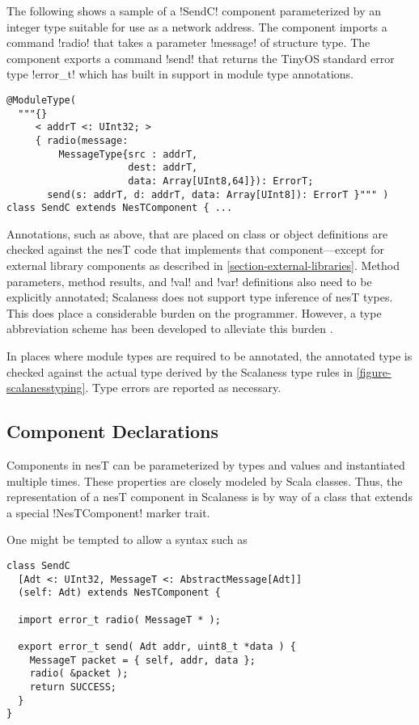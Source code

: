 The following shows a sample of a !SendC! component parameterized by an integer type suitable
for use as a network address. The component imports a command !radio! that takes a parameter
!message! of structure type. The component exports a command !send! that returns the TinyOS
standard error type !error_t! which has built in support in module type annotations.

\singlespace
\vspace{1.0ex}
\begin{lstlisting}[language=scalaness]
@ModuleType(
  """{}
     < addrT <: UInt32; >
     { radio(message:
         MessageType{src : addrT,
                     dest: addrT,
                     data: Array[UInt8,64]}): ErrorT;
       send(s: addrT, d: addrT, data: Array[UInt8]): ErrorT }""" )
class SendC extends NesTComponent { ...
\end{lstlisting}
\vspace{1.0ex}
\primaryspacing

Annotations, such as above, that are placed on class or object definitions are checked against
the nesT code that implements that component---except for external library components as
described in \autoref{section-external-libraries}. Method parameters, method results, and !val!
and !var! definitions also need to be explicitly annotated; Scalaness does not support type
inference of nesT types. This does place a considerable burden on the programmer. However, a
type abbreviation scheme has been developed to alleviate this burden \cite{watson-masters-2013}.

In places where module types are required to be annotated, the annotated type is checked against
the actual type derived by the Scalaness type rules in \autoref{figure-scalanesstyping}. Type
errors are reported as necessary.

\subsection{Component Declarations}
\label{section-component-declarations}

Components in nesT can be parameterized by types and values and instantiated multiple times.
These properties are closely modeled by Scala classes. Thus, the representation of a nesT
component in Scalaness is by way of a class that extends a special !NesTComponent! marker trait.

One might be tempted to allow a syntax such as

\singlespace
\vspace{1.0ex}
\begin{lstlisting}[language=scalaness]
class SendC
  [Adt <: UInt32, MessageT <: AbstractMessage[Adt]]
  (self: Adt) extends NesTComponent {

  import error_t radio( MessageT * );

  export error_t send( Adt addr, uint8_t *data ) {
    MessageT packet = { self, addr, data };
    radio( &packet );
    return SUCCESS;
  }
}
\end{lstlisting}
\vspace{1.0ex}
\primaryspacing

